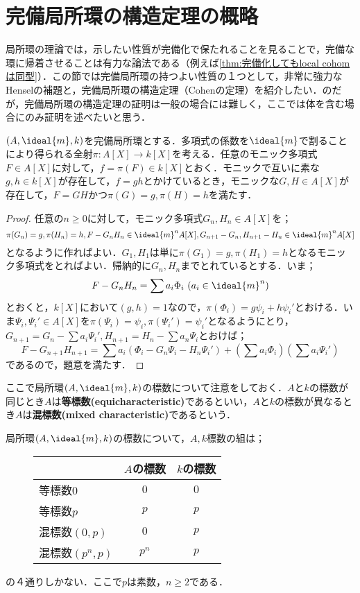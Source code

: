 \section{完備局所環の構造定理の概略}

局所環の理論では，示したい性質が完備化で保たれることを見ることで，完備な環に帰着させることは有力な論法である（例えば\ref{thm:完備化してもlocal cohomは同型}）．この節では完備局所環の持つよい性質の１つとして，非常に強力なHenselの補題と，完備局所環の構造定理（Cohenの定理）を紹介したい．のだが，完備局所環の構造定理の証明は一般の場合には難しく，ここでは体を含む場合にのみ証明を述べたいと思う．

\begin{thm}[Henselの補題]
	$(A,\ideal{m},k)$を完備局所環とする．多項式の係数を$\ideal{m}$で割ることにより得られる全射$\pi:A[X]\to k[X]$を考える．任意のモニック多項式$F\in A[X]$に対して，$f=\pi(F)\in k[X]$とおく．モニックで互いに素な$g,h\in k[X]$が存在して，$f=gh$とかけているとき，モニックな$G,H\in A[X]$が存在して，$F=GH$かつ$\pi(G)=g,\pi(H)=h$を満たす．
\end{thm}

\begin{proof}
	任意の$n\geq0$に対して，モニック多項式$G_n,H_n\in A[X]$を；
	\[\pi(G_n)=g, \pi(H_n)=h, F-G_nH_n\in\ideal{m}^nA[X], G_{n+1}-G_n,H_{n+1}-H_n\in\ideal{m}^n A[X]\]
	となるように作ればよい．$G_1,H_1$は単に$\pi(G_1)=g,\pi(H_1)=h$となるモニック多項式をとればよい．帰納的に$G_n,H_n$までとれているとする．いま；
	\[F-G_nH_n=\sum a_i\Phi_i~(a_i\in\ideal{m}^n)\]
	とおくと，$k[X]$において$(g,h)=1$なので，$\pi(\Phi_i)=g\psi_i+h\psi_i'$とおける．いま$\Psi_i,\Psi_i'\in A[X]$を$\pi(\Psi_i)=\psi_i,\pi(\Psi_i')=\psi_i'$となるようにとり，$G_{n+1}=G_n-\sum a_i\Psi_i', H_{n+1}=H_n-\sum a_n\Psi_i$とおけば；
	\[F-G_{n+1}H_{n+1}=\sum a_i(\Phi_i-G_n\Psi_i-H_n\Psi_i') +(\sum a_i\Phi_i)(\sum a_i\Psi_i')\]
	であるので，題意を満たす．
\end{proof}

ここで局所環$(A,\ideal{m},k)$の標数について注意をしておく．$A$と$k$の標数が同じとき$A$は\textbf{等標数(equicharacteristic)}であるといい，$A$と$k$の標数が異なるとき$A$は\textbf{混標数(mixed characteristic)}であるという．

\begin{prop}
	局所環$(A,\ideal{m},k)$の標数について，$A,k$標数の組は；
	\begin{figure}[H]
		\centering
		\begin{tabular}{l|cc}
			&$A$の標数&$k$の標数\\
			\hline
			等標数$0$&$0$&$0$\\
			等標数$p$&$p$&$p$\\
			混標数$(0,p)$&$0$&$p$\\
			混標数$(p^n,p)$&$p^n$&$p$
		\end{tabular}
	\end{figure}
	の４通りしかない．ここで$p$は素数，$n\geq 2$である．
\end{prop}


